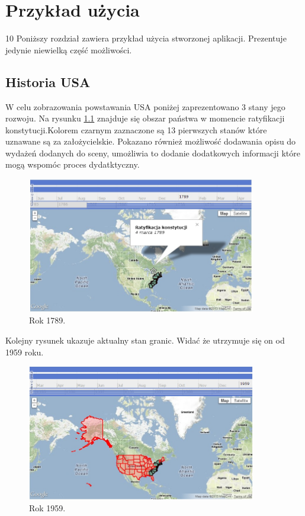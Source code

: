 \chapter{Przykład użycia}
\label{sec:useexample}
10 %
Poniższy rozdział zawiera przykład użycia stworzonej aplikacji. Prezentuje jedynie niewielką część możliwości.


\section{Historia USA}
\label{sec:usahistory}

W celu zobrazowania powstawania USA poniżej zaprezentowano 3 stany jego rozwoju. Na rysunku \ref{fig:st1} znajduje się obszar państwa w momencie ratyfikacji konstytucji.Kolorem czarnym zaznaczone są 13 pierwszych stanów które uznawane są za założycielskie. Pokazano również możliwość dodawania opisu do wydażeń dodanych do sceny, umożliwia to dodanie dodatkowych informacji które mogą wspomóc proces dydatktyczny.

\begin{figure}[H]
  \centering
    \includegraphics[width=100mm]{ge/st1.jpg}
  \caption{Rok 1789.}
  \label{fig:st1}
\end{figure}

Kolejny rysunek ukazuje aktualny stan granic. Widać że utrzymuje się on od 1959 roku.

\begin{figure}[H]
  \centering
    \includegraphics[width=100mm]{ge/st3.jpg}
  \caption{Rok 1959.}
  \label{fig:st3}
\end{figure}

